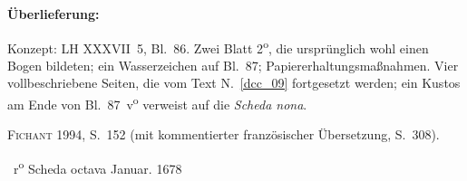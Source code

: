 %
%
%
%
%
\frenchspacing%
%
\begin{ledgroupsized}[r]{120mm}%
\footnotesize%
\pstart%
\noindent%
\textbf{Überlieferung:}%
\pend%
\end{ledgroupsized}%
\begin{ledgroupsized}[r]{114mm}%
\footnotesize%
\pstart%
\parindent -6mm%
%
Konzept:
LH XXXVII~5, Bl.~86.
Zwei Blatt 2\textsuperscript{o},
die ursprünglich wohl einen Bogen bildeten;
ein Wasserzeichen auf Bl.~87;
Papiererhaltungsmaßnahmen.
Vier vollbeschriebene Seiten,
die vom Text N.~\ref{dcc_09} %
fortgesetzt werden;
ein Kustos am Ende von Bl.~87~v\textsuperscript{o} verweist auf die \textit{Scheda nona}. 
\pend%
%
\end{ledgroupsized}%
\begin{ledgroupsized}[r]{114mm}%
\footnotesize%
\pstart%
\parindent -6mm%
%
\textsc{Fichant} 1994, S.~152 (mit kommentierter französischer Übersetzung, S.~308).%
\cite{01056}
\pend%
\end{ledgroupsized}%
%
%
\frenchspacing%
%
\count{}%
\count{}%
\count{}
%
\vspace{8mm}%
\normalsize%
\pstart%
\noindent%
%
~r\textsuperscript{o}\rbrack%
\hspace{46mm}
Scheda octava%
\protect{}%
\hspace{36mm}
Januar. 1678%
%
%

